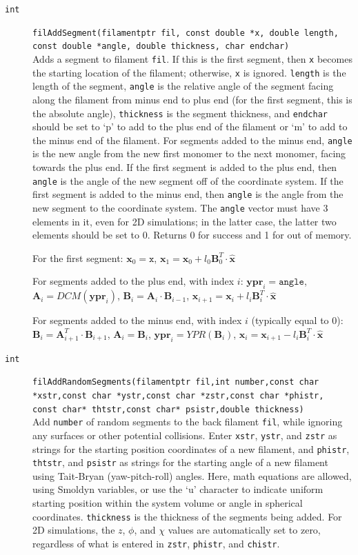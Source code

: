 \documentclass {scrbook}
\newcommand {\ttt} {\texttt}
\begin{document}
\begin{description}
\item[\ttt{int}]
\ttt{filAddSegment(filamentptr fil, const double *x, double length, const double *angle, double thickness, char endchar)}
\hfill \\
Adds a segment to filament \ttt{fil}. If this is the first segment, then \ttt{x} becomes the starting location of the filament; otherwise, \ttt{x} is ignored. \ttt{length} is the length of the segment, \ttt{angle} is the relative angle of the segment facing along the filament from minus end to plus end (for the first segment, this is the absolute angle), \ttt{thickness} is the segment thickness, and \ttt{endchar} should be set to `p' to add to the plus end of the filament or `m' to add to the minus end of the filament. For segments added to the minus end, \ttt{angle} is the new angle from the new first monomer to the next monomer, facing towards the plus end. If the first segment is added to the plus end, then \ttt{angle} is the angle of the new segment off of the coordinate system. If the first segment is added to the minus end, then \ttt{angle} is the angle from the new segment to the coordinate system. The \ttt{angle} vector must have 3 elements in it, even for 2D simulations; in the latter case, the latter two elements should be set to 0. Returns 0 for success and 1 for out of memory.

For the first segment:
$\bm{x}_0=\ttt{x}$, 
$\bm{x}_1=\bm{x}_0 + l_0 \bm{B}^T_0 \cdot \bm{\hat{x}}$

For segments added to the plus end, with index $i$:
$\bm{ypr}_i = \ttt{angle}$, 
$\bm{A}_i = DCM(\bm{ypr}_i)$, 
$\bm{B}_i = \bm{A}_i \cdot \bm{B}_{i-1}$, 
$\bm{x}_{i+1} = \bm{x}_i + l_i \bm{B}^T_i \cdot \bm{\hat{x}}$

For segments added to the minus end, with index $i$ (typically equal to 0):
$\bm{B}_i = \bm{A}_{i+1}^T \cdot \bm{B}_{i+1}$, 
$\bm{A}_i = \bm{B}_i$,
$\bm{ypr}_i = YPR(\bm{B}_i)$, 
$\bm{x}_i = \bm{x}_{i+1} - l_i \bm{B}^T_i \cdot \bm{\hat{x}}$

\item[\ttt{int}]
\ttt{filAddRandomSegments(filamentptr fil,int number,const char *xstr,const char *ystr,const char *zstr,const char *phistr, const char* thtstr,const char* psistr,double thickness)}
\hfill \\
Add \ttt{number} of random segments to the back filament \ttt{fil}, while ignoring any surfaces or other potential collisions. Enter \ttt{xstr}, \ttt{ystr}, and \ttt{zstr} as strings for the starting position coordinates of a new filament, and \ttt{phistr}, \ttt{thtstr}, and \ttt{psistr} as strings for the starting angle of a new filament using Tait-Bryan (yaw-pitch-roll) angles. Here, math equations are allowed, using Smoldyn variables, or use the `u' character to indicate uniform starting position within the system volume or angle in spherical coordinates. \ttt{thickness} is the thickness of the segments being added. For 2D simulations, the $z$, $\phi$, and $\chi$ values are automatically set to zero, regardless of what is entered in \ttt{zstr}, \ttt{phistr}, and \ttt{chistr}.


\end{description}
\end{document}
